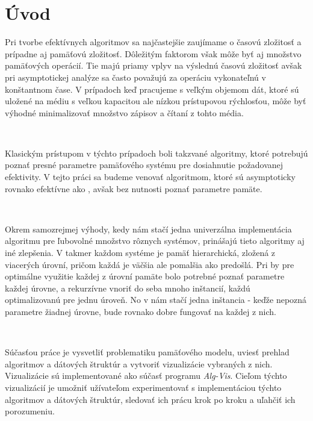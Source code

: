 \section{Úvod}

Pri tvorbe efektívnych algoritmov sa najčastejšie zaujímame o časovú zložitosť a prípadne aj pamäťovú zložitosť. Dôležitým faktorom však môže byť aj množstvo pamäťových operácií. Tie majú priamy vplyv na výslednú časovú zložitosť avšak pri asymptotickej analýze sa často považujú za operáciu vykonateľnú v konštantnom čase. V prípadoch keď pracujeme s veľkým objemom dát, ktoré sú uložené na médiu s veľkou kapacitou ale nízkou prístupovou rýchlosťou, môže byť výhodné minimalizovať množstvo zápisov a čítaní z tohto média.

\

Klasickým prístupom v týchto prípadoch boli takzvané \aware algoritmy, ktoré potrebujú poznať presné parametre pamäťového systému pre dosiahnutie požadovanej efektivity. V tejto práci sa budeme venovať \obliv algoritmom, ktoré sú asymptoticky rovnako efektívne ako \aware, avšak bez nutnosti poznať parametre pamäte.

\

Okrem samozrejmej výhody, kedy nám stačí jedna univerzálna implementácia algoritmu pre ľubovolné množstvo rôznych systémov, prinášajú tieto algoritmy aj iné zlepšenia. V takmer každom systéme je pamäť hierarchická, zložená z viacerých úrovní, pričom každá je väčšia ale pomalšia ako predošlá. Pri \aware by pre optimálne využitie každej z úrovní pamäte bolo potrebné poznať parametre každej úrovne, a rekurzívne vnoriť do seba mnoho inštancií, každú optimalizovanú pre jednu úroveň. No v \obliv nám stačí jedna inštancia - keďže nepozná parametre žiadnej úrovne, bude rovnako dobre fungovať na každej z nich.

\

Súčasťou práce je vysvetliť problematiku \obliv pamäťového modelu, uviesť prehlad algoritmov a dátových štruktúr a vytvoriť vizualizácie vybraných z nich. Vizualizácie sú implementované ako súčasť programu {\em Alg-Vis}. Cieľom týchto vizualizácií je umožniť užívateľom experimentovať s implementáciou týchto algoritmov a dátových štruktúr, sledovať ich prácu krok po kroku a uľahčiť ich porozumeniu.